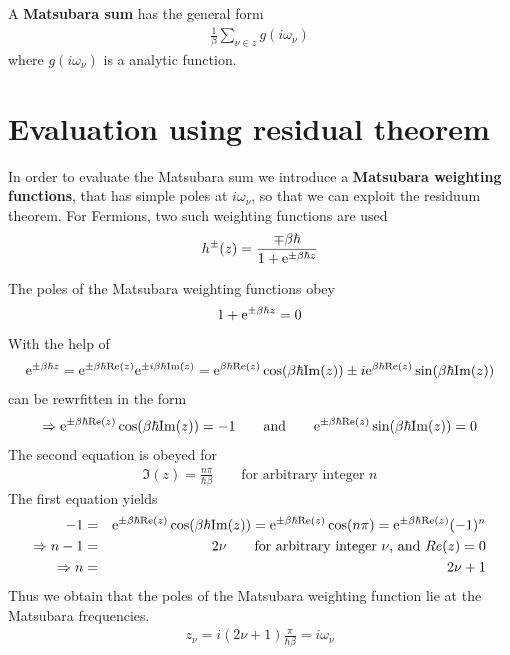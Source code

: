 \documentclass[11pt,a4paper]{report}
\begin{document}
A \textbf{Matsubara sum}
 has the general form
\begin{eqnarray*}
\frac{1}{\beta}\sum_{\nu\in z} g(i\omega_\nu)
\end{eqnarray*}
where $g(i\omega_\nu)$ is a analytic function.

\section{Evaluation using residual theorem}
In order to evaluate the Matsubara sum we introduce a
\textbf{Matsubara weighting functions}, that has simple poles at $i\omega_\nu$, so that we can
exploit the residuum theorem. For Fermions, two such weighting
functions are used
\begin{eqnarray}
h^\pm(z)=\frac{\mp\beta\hbar}{1+\mathrm{e}^{\pm\beta\hbar z}}
\end{eqnarray}

The poles of the Matsubara weighting functions obey
\begin{eqnarray}
1+\mathrm{e}^{\pm\beta\hbar z}=0
\label{eq:matsubarapolecond}
\end{eqnarray}
With the help of
\begin{eqnarray*}
\mathrm{e}^{\pm\beta\hbar z}
=\mathrm{e}^{\pm\beta\hbar\mathrm{Re}(z)}\mathrm{e}^{\pm i\beta\hbar\mathrm{Im}(z)}
=\mathrm{e}^{\beta\hbar\mathrm{Re}(z)}\cos(\beta\hbar\mathrm{Im}(z))
\pm i\mathrm{e}^{\beta\hbar\mathrm{Re}(z)}\sin(\beta\hbar\mathrm{Im}(z))
\end{eqnarray*}
 can be rewrfitten in the form
\begin{eqnarray}
\Rightarrow
\mathrm{e}^{\pm \beta\hbar\mathrm{Re}(z)}\cos(\beta\hbar\mathrm{Im}(z))=-1
\qquad\text{and}\qquad
\mathrm{e}^{\pm \beta\hbar\mathrm{Re}(z)}\sin(\beta\hbar\mathrm{Im}(z))=0
\end{eqnarray}
The second equation is obeyed for
\begin{eqnarray}
\Im(z)=\frac{n\pi}{\hbar\beta}\qquad\text{for arbitrary integer $n$}
\end{eqnarray}
The first equation yields
\begin{eqnarray}
-1&=&\mathrm{e}^{\pm\beta\hbar\mathrm{Re}(z)}\cos(\beta\hbar\mathrm{Im}(z))
=\mathrm{e}^{\pm\beta\hbar\mathrm{Re}(z)}\cos(n\pi)
=\mathrm{e}^{\pm\beta\hbar\mathrm{Re}(z)}(-1)^n
\nonumber\\
\Rightarrow
n-1&=&2\nu \qquad\text{for arbitrary integer $\nu$, and $Re(z)=0$}
\nonumber\\
\Rightarrow
n&=&2\nu+1
\end{eqnarray}
Thus we obtain that the poles of the Matsubara weighting function lie
at the Matsubara frequencies.
\begin{eqnarray}
z_\nu=i(2\nu+1)\frac{\pi}{\hbar\beta}=i\omega_\nu
\end{eqnarray}
\end{document}
